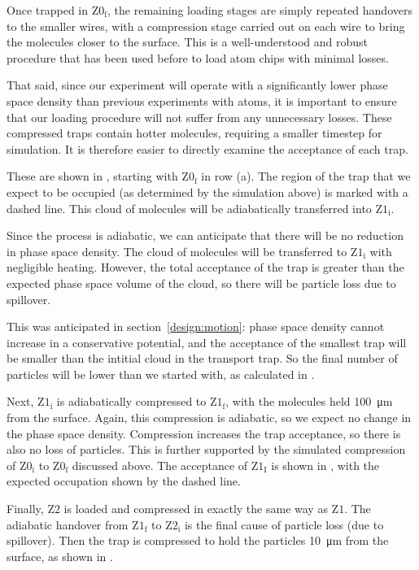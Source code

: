 Once trapped in $\mathrm{Z0_f}$, the remaining loading stages are simply
repeated handovers to the smaller wires, with a compression stage carried out
on each wire to bring the molecules closer to the surface. This is a
well-understood and robust procedure that has been used before to load atom
chips with minimal losses.~\cite{Reichel2002}

That said, since our experiment will operate with a significantly lower phase
space density than previous experiments with atoms, it is important to ensure
that our loading procedure will not suffer from any unnecessary losses. These
compressed traps contain hotter molecules, requiring a smaller timestep for
simulation. It is therefore easier to directly examine the acceptance of each
trap.

These are shown in , starting with
$\mathrm{Z0_f}$ in row (a). The region of the trap that we expect to be
occupied (as determined by the simulation above) is marked with a dashed line.
This cloud of molecules will be adiabatically transferred into $\mathrm{Z1_i}$.

Since the process is adiabatic, we can anticipate that there will be no
reduction in phase space density. The cloud of molecules will be transferred to
$\mathrm{Z1_i}$ with negligible heating. However, the total acceptance of the
trap is greater than the expected phase space volume of the cloud, so there
will be particle loss due to spillover.

This was anticipated in section~\ref{design:motion}: phase space density cannot
increase in a conservative potential, and the acceptance of the smallest trap
will be smaller than the intitial cloud in the transport trap. So the final
number of particles will be lower than we started with, as calculated in
.

Next, $\mathrm{Z1_i}$ is adiabatically compressed to $\mathrm{Z1_f}$, with the
molecules held \SI{100}{\micro\meter} from the surface. Again, this
compression is adiabatic, so we expect no change in the phase space density.
Compression increases the trap acceptance, so there is also no loss of
particles. This is further supported by the simulated compression of
$\mathrm{Z0_i}$ to $\mathrm{Z0_f}$ discussed above. The acceptance of
$\mathrm{Z1_I}$ is shown in , with
the expected occupation shown by the dashed line.

Finally, $\mathrm{Z2}$ is loaded and compressed in exactly the same way as
$\mathrm{Z1}$. The adiabatic handover from $\mathrm{Z1_f}$ to $\mathrm{Z2_i}$
is the final cause of particle loss (due to spillover). Then the trap is
compressed to hold the particles \SI{10}{\micro\meter} from the surface, as
shown in .



